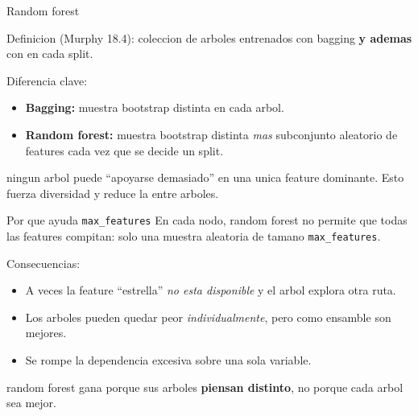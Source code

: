 \begin{frame}{Random forest}
\begin{block}{Definicion}
\small
{} (Murphy 18.4): coleccion de arboles entrenados con bagging \textbf{y ademas} con  en cada split.
\end{block}

\vspace{0.3em}
Diferencia clave:
\begin{itemize}\small
  \item \textbf{Bagging:} muestra bootstrap distinta en cada arbol.
  \item \textbf{Random forest:} muestra bootstrap distinta \emph{mas} subconjunto aleatorio de features cada vez que se decide un split.
\end{itemize}

\vspace{0.3em}
 ningun arbol puede ``apoyarse demasiado'' en una unica feature dominante. Esto fuerza diversidad y reduce la  entre arboles.
\end{frame}

\begin{frame}{Por que ayuda \texttt{max\_features}}
En cada nodo, random forest no permite que todas las features compitan: solo una muestra aleatoria de tamano \texttt{max\_features}.

\vspace{0.3em}
Consecuencias:
\begin{itemize}\small
  \item A veces la feature ``estrella'' \emph{no esta disponible} y el arbol explora otra ruta.
  \item Los arboles pueden quedar peor \emph{individualmente}, pero como ensamble son mejores.
  \item Se rompe la dependencia excesiva sobre una sola variable.
\end{itemize}

\vspace{0.3em}
 random forest gana porque sus arboles \textbf{piensan distinto}, no porque cada arbol sea mejor.
\end{frame}

